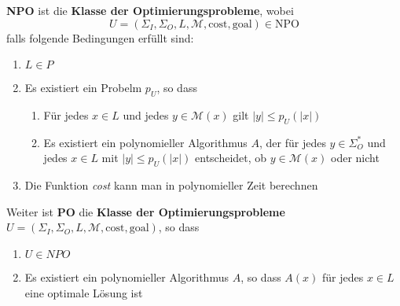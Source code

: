 \documentclass[11pt]{article}
\newcommand{\npo}{\text{NPO}}
\begin{document}
\textbf{NPO} ist die \textbf{Klasse der Optimierungsprobleme}, wobei 
\begin{equation*}
	U = (\Sigma_I, \Sigma_O, L, \mathcal{M}, \text{cost}, \text{goal}) \in \npo
\end{equation*}
falls folgende Bedingungen erf{\"u}llt sind:
\begin{enumerate}[label=(\roman*), noitemsep]
	\item $L \in P$
	\item Es existiert ein Probelm $p_U$, so dass
		\begin{enumerate}
			\item F{\"u}r jedes $x \in L$ und jedes $y \in \mathcal{M}(x)$ gilt $|y| \leq p_U(|x|)$
			\item Es existiert ein polynomieller Algorithmus $A$, der f{\"u}r jedes $y \in \Sigma_O^*$ und jedes $x \in L$ mit $|y| \leq p_U(|x|)$ entscheidet, ob $y \in \mathcal{M}(x)$ oder nicht
		\end{enumerate}
	\item Die Funktion \emph{cost} kann man in polynomieller Zeit berechnen
\end{enumerate}

Weiter ist \textbf{PO} die \textbf{Klasse der Optimierungsprobleme} $U = (\Sigma_I, \Sigma_O, L, \mathcal{M}, \text{cost}, \text{goal})$, so dass
\begin{enumerate}[label=(\roman*), noitemsep]
	\item $U \in NPO$
	\item Es existiert ein polynomieller Algorithmus $A$, so dass $A(x)$ f{\"u}r jedes $x \in L$ eine optimale Lösung ist
\end{enumerate}
\end{document}
